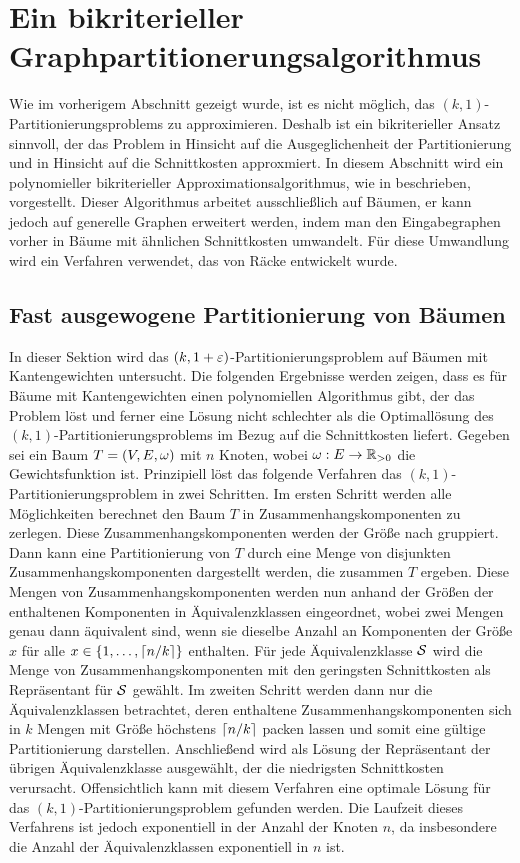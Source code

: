 \section{Ein bikriterieller Graphpartitionerungsalgorithmus}
Wie im vorherigem Abschnitt gezeigt wurde, ist es nicht möglich, das $(k,1)$\hyp Partitionierungsproblems zu approximieren. 
Deshalb ist ein bikriterieller Ansatz sinnvoll, der das Problem in Hinsicht auf die Ausgeglichenheit der Partitionierung und in Hinsicht auf die Schnittkosten approxmiert.
In diesem Abschnitt wird ein polynomieller bikriterieller Approximationsalgorithmus, wie in \parencite{FF15} beschrieben, vorgestellt.
Dieser Algorithmus arbeitet ausschließlich auf Bäumen, er kann jedoch auf generelle Graphen erweitert werden, indem man den Eingabegraphen vorher in Bäume mit ähnlichen Schnittkosten umwandelt.
Für diese Umwandlung wird ein Verfahren verwendet, das von Räcke entwickelt wurde. \parencite{rc08}

\subsection{Fast ausgewogene Partitionierung von Bäumen}\label{sec:treepartitioning}
In dieser Sektion wird das $(k,1+\eps)$\hyp Partitionierungsproblem auf Bäumen mit Kantengewichten untersucht. 
Die folgenden Ergebnisse werden zeigen, dass es für Bäume mit Kantengewichten einen polynomiellen Algorithmus gibt, der das Problem löst und ferner eine Lösung nicht schlechter als die Optimallösung des $(k,1)$\hyp Partitionierungsproblems im Bezug auf die Schnittkosten liefert.
Gegeben sei ein Baum $T = (V,E,\weight)$ mit $n$ Knoten, wobei $\weight : E \rightarrow \reals_{> 0}$ die Gewichtsfunktion ist.
Prinzipiell löst das folgende Verfahren das $(k,1)$\hyp Partitionierungsproblem in zwei Schritten.
Im ersten Schritt werden alle Möglichkeiten berechnet den Baum $T$ in Zusammenhangskomponenten zu zerlegen.
Diese Zusammenhangskomponenten werden der Größe nach gruppiert.
Dann kann eine Partitionierung von $T$ durch eine Menge von disjunkten Zusammenhangskomponenten dargestellt werden, die zusammen $T$ ergeben. 
Diese Mengen von Zusammenhangskomponenten werden nun anhand der Größen der enthaltenen Komponenten in Äquivalenzklassen eingeordnet, wobei zwei Mengen genau dann äquivalent sind, wenn sie dieselbe Anzahl an Komponenten der Größe $x$ für alle $x \in \{1, \ldots, \ceil*{n/k}\}$ enthalten.
Für jede Äquivalenzklasse $\calS$ wird die Menge von Zusammenhangskomponenten mit den geringsten Schnittkosten als Repräsentant für $\calS$ gewählt.
Im zweiten Schritt werden dann nur die Äquivalenzklassen betrachtet, deren enthaltene Zusammenhangskomponenten sich in $k$ Mengen mit Größe höchstens $\ceil*{n/k}$ packen lassen und somit eine gültige Partitionierung darstellen.
Anschließend wird als Lösung der Repräsentant der übrigen Äquivalenzklasse ausgewählt, der die niedrigsten Schnittkosten verursacht.
Offensichtlich kann mit diesem Verfahren eine optimale Lösung für das $(k,1)$\hyp Partitionierungsproblem gefunden werden.
Die Laufzeit dieses Verfahrens ist jedoch exponentiell in der Anzahl der Knoten $n$, da insbesondere die Anzahl der Äquivalenzklassen exponentiell in $n$ ist.

